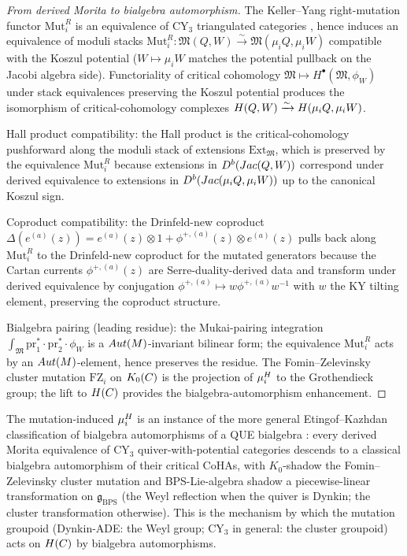 \begin{proof}[From derived Morita to bialgebra automorphism]
  The Keller--Yang right-mutation functor $\mathrm{Mut}_i^R$ is an
  equivalence of CY$_3$ triangulated categories
  \cite[Thm 3.2]{KellerYang2011}, hence induces an equivalence of
  moduli stacks $\mathrm{Mut}_i^R \colon \mathfrak{M}(Q, W) \xrightarrow{\sim}
  \mathfrak{M}(\mu_i Q, \mu_i W)$ compatible with the Koszul potential
  ($W \mapsto \mu_i W$ matches the potential pullback on the Jacobi
  algebra side). Functoriality of critical cohomology
  $\mathfrak{M} \mapsto H^\bullet(\mathfrak{M}, \phi_W)$ under stack equivalences
  preserving the Koszul potential produces the isomorphism of
  critical-cohomology complexes $H(Q, W) \xrightarrow{\sim} H(\mu_i Q, \mu_i W)$.

  Hall product compatibility: the Hall product is the critical-cohomology
  pushforward along the moduli stack of extensions
  $\mathrm{Ext}_{\mathfrak{M}}$, which is preserved by the equivalence
  $\mathrm{Mut}_i^R$ because extensions in $D^b(Jac(Q, W))$ correspond
  under derived equivalence to extensions in $D^b(Jac(\mu_i Q, \mu_i W))$
  up to the canonical Koszul sign.

  Coproduct compatibility: the Drinfeld-new coproduct
  $\Delta(e^{(a)}(z)) = e^{(a)}(z) \otimes 1 + \phi^{+,(a)}(z) \otimes e^{(a)}(z)$
  pulls back along $\mathrm{Mut}_i^R$ to the Drinfeld-new coproduct for
  the mutated generators because the Cartan currents $\phi^{+,(a)}(z)$
  are Serre-duality-derived data and transform under derived equivalence
  by conjugation $\phi^{+,(a)} \mapsto w \phi^{+,(a)} w^{-1}$ with $w$
  the KY tilting element, preserving the coproduct structure.

  Bialgebra pairing (leading residue): the Mukai-pairing integration
  $\int_{\mathfrak{M}} \mathrm{pr}_1^* \cdot \mathrm{pr}_2^* \cdot \phi_W$ is a
  $Aut(M)$-invariant bilinear form; the equivalence
  $\mathrm{Mut}_i^R$ acts by an $Aut(M)$-element, hence preserves
  the residue. The Fomin--Zelevinsky cluster mutation $\mathrm{FZ}_i$
  on $K_0(C)$ is the projection of $\mu_i^{H}$ to the Grothendieck
  group; the lift to $H(C)$ provides the bialgebra-automorphism
  enhancement.
\end{proof}

\begin{remark}
  \label{rem:etingof-kazhdan-bialg-auto}
  The mutation-induced $\mu_i^{H}$ is an instance of the more general
  Etingof--Kazhdan classification of bialgebra automorphisms of a QUE
  bialgebra \cite[\S 5]{EtingofKazhdan1996}: every derived Morita
  equivalence of CY$_3$ quiver-with-potential categories descends to
  a classical bialgebra automorphism of their critical CoHAs, with
  $K_0$-shadow the Fomin--Zelevinsky cluster mutation and BPS-Lie-algebra
  shadow a piecewise-linear transformation on $\mathfrak{g}_{\mathrm{BPS}}$
  (the Weyl reflection when the quiver is Dynkin; the cluster
  transformation otherwise). This is the mechanism by which the mutation
  groupoid (Dynkin-ADE: the Weyl group; CY$_3$ in general: the cluster
  groupoid) acts on $H(C)$ by bialgebra automorphisms.
\end{remark}

